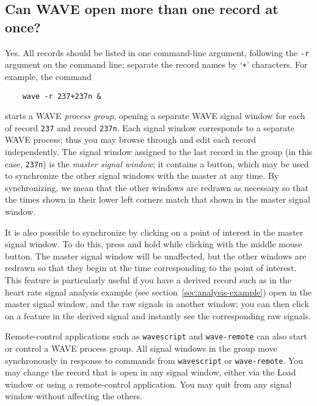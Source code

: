 \documentclass[twoside]{book}
\newcommand{\keycap}[1]{\cornersize{.5}\Ovalbox{\small\sf #1}}
\newcommand{\button}[1]{\cornersize{2}\ovalbox{\rule[-.3mm]{0cm}{2.5mm}\small\sf ~#1~}}
\newcommand{\WAVE}{{\sf WAVE}\xspace}
\begin{document}
\subsection{Can \WAVE{} open more than one record at once?}

\index{r option for WAVE@{\tt -r} option for \WAVE{}}
Yes. All records should be listed in one command-line argument,
following the {\tt -r} argument on the command line;  separate the
record names by `{\tt +}' characters.  For example, the command
\begin{verbatim}
    wave -r 237+237n &
\end{verbatim}
starts a \WAVE{} \emph{process group}, opening a separate \WAVE{} signal
window for each of record {\tt 237} and record {\tt 237n}.  Each signal window
corresponds to a separate \WAVE{} process;  thus you may browse through and
edit each record independently.  The signal window assigned to the last record
in the group (in this case, {\tt 237n}) is the \emph{master signal window};
it contains a \button{Sync} button, which may be used to synchronize the other
signal windows with the master at any time.  By synchronizing, we mean that the
other windows are redrawn as necessary so that the times shown in their lower
left corners match that shown in the master signal window.

It is also possible to synchronize by clicking on a point of interest in the
master signal window.  To do this, press and hold \keycap{Ctrl} while clicking
with the middle mouse button.  The master signal window will be unaffected,
but the other windows are redrawn so that they begin at the time corresponding
to the point of interest.  This feature is particularly useful if you have
a derived record such as in the heart rate signal analysis example (see
section~\ref{sec:analysis-example}) open in the master signal window, and
the raw signals in another window;  you can then click on a feature in the
derived signal and instantly see the corresponding raw signals.

Remote-control applications such as {\tt wavescript} and {\tt wave-remote} can
also start or control a \WAVE{} process group.  All signal windows in the
group move synchronously in response to commands from {\tt wavescript} or
{\tt wave-remote}.  You may change the record that is open in any signal
window, either via the {\sf Load} window or using a remote-control application.
You may quit from any signal window without affecting the others.
\end{document}
